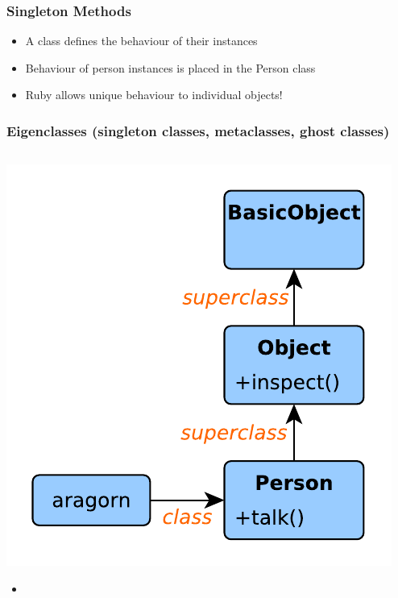 \begin{frame}[fragile]\frametitle{Singleton Methods}

\begin{itemize}
\item A class defines the behaviour of their instances
\item Behaviour of person instances is placed in the Person class
\item Ruby allows unique behaviour to individual objects!
\end{itemize}

\pause


\end{frame}




\begin{frame}[fragile]\frametitle{Eigenclasses (singleton classes, metaclasses, ghost classes)}

\begin{columns}[c] 

\begin{column}{5.5cm}
\includegraphics[scale=0.55]{diagrams/object_lookup_path.pdf}

\begin{itemize}
\item {}
\end{itemize}
\end{column}


\end{columns}
\end{frame}
